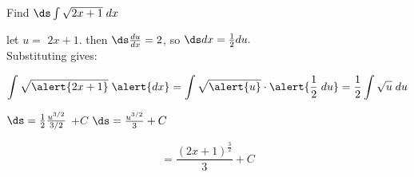 \begin{frame}
\begin{example}
Find $\ds \int \sqrt{2x+1}\; dx$\\ \vspace*{3mm}

\pause


let $ u= $ \pause $ 2x+1. $ \pause  then $\ds  \frac{du}{dx} = 2 $, so $\ds dx = \frac12du. $\\
Substituting gives:

\pause

\[
\int \sqrt{\alert{2x+1}}\; \alert{dx} = \int \sqrt{\alert{u}}\cdot \alert{\frac12\;du} = \frac12 \int \sqrt{u}\; du 
\]

\begin{center}
$\ds  =\frac12 \frac{u^{3/2}}{3/2}$ \pause  $ +C $ \pause $\ds  =\frac{u^{3/2}}{3}+C $

\end{center}\pause
\[
=\frac{(2x+1)^{\frac32}}{3}+C
\]
\end{example}

\end{frame}
